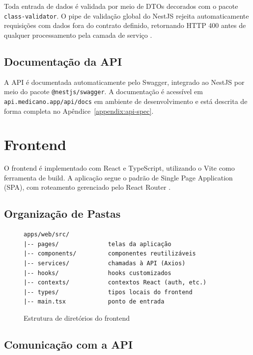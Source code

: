 Toda entrada de dados é validada por meio de DTOs
decorados com o pacote \texttt{class-validator}.
O pipe de validação global do NestJS rejeita
automaticamente requisições com dados fora do
contrato definido, retornando HTTP 400 antes de
qualquer processamento pela camada de serviço
\cite{nestjs2024}.

\subsection{Documentação da API}
\label{subsec:swagger}

A API é documentada automaticamente pelo Swagger,
integrado ao NestJS por meio do pacote
\texttt{@nestjs/swagger}. A documentação é acessível
em \texttt{api.medicano.app/api/docs} em ambiente
de desenvolvimento e está descrita de forma completa
no Apêndice~\ref{appendix:api-spec}.

\section{Frontend}
\label{sec:frontend}

O frontend é implementado com React e TypeScript,
utilizando o Vite como ferramenta de build. A
aplicação segue o padrão de Single Page Application
(SPA), com roteamento gerenciado pelo React Router
\cite{reactdev2024}.

\subsection{Organização de Pastas}
\label{subsec:frontend-structure}

\begin{figure}[H]
  \centering
  \caption{Estrutura de diretórios do frontend}
  \label{fig:frontend-structure}
\begin{verbatim}
apps/web/src/
|-- pages/              telas da aplicação
|-- components/         componentes reutilizáveis
|-- services/           chamadas à API (Axios)
|-- hooks/              hooks customizados
|-- contexts/           contextos React (auth, etc.)
|-- types/              tipos locais do frontend
|-- main.tsx            ponto de entrada
\end{verbatim}
\end{figure}

\subsection{Comunicação com a API}
\label{subsec:api-communication}

